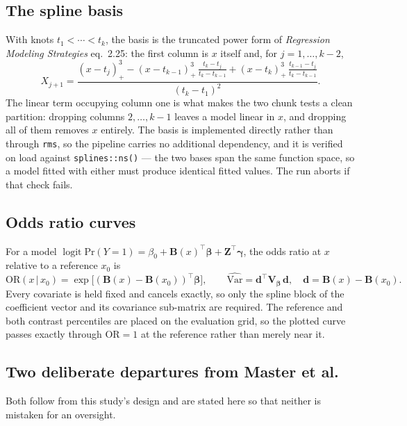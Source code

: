 \documentclass[11pt]{article}
\providecommand{\Pr}{\mathrm{Pr}}
\newcommand{\code}[1]{\texttt{\small #1}}
\begin{document}
\subsection{The spline basis} With knots $t_1 < \cdots < t_k$, the basis is the
truncated power form of \emph{Regression Modeling Strategies} eq.~2.25: the
first column is $x$ itself and, for $j = 1, \ldots, k-2$,
\[
X_{j+1} = \frac{(x-t_j)_+^3
 - (x-t_{k-1})_+^3\,\frac{t_k-t_j}{t_k-t_{k-1}}
 + (x-t_k)_+^3\,\frac{t_{k-1}-t_j}{t_k-t_{k-1}}}{(t_k-t_1)^2}.
\]
The linear term occupying column one is what makes the two chunk tests a clean
partition: dropping columns $2,\ldots,k-1$ leaves a model linear in $x$, and
dropping all of them removes $x$ entirely. The basis is implemented directly
rather than through \code{rms}, so the pipeline carries no additional dependency,
and it is verified on load against \code{splines::ns()} --- the two bases span
the same function space, so a model fitted with either must produce identical
fitted values. The run aborts if that check fails.

\subsection{Odds ratio curves} For a model
$\operatorname{logit}\Pr(Y=1) = \beta_0 + \mathbf{B}(x)^\top\boldsymbol\beta + \mathbf{Z}^\top\boldsymbol\gamma$,
the odds ratio at $x$ relative to a reference $x_0$ is
\[
\mathrm{OR}(x \,\vert\, x_0) = \exp\!\big[(\mathbf{B}(x)-\mathbf{B}(x_0))^\top \boldsymbol\beta\big],
\qquad
\widehat{\mathrm{Var}} = \mathbf{d}^\top \mathbf{V}_{\boldsymbol\beta}\, \mathbf{d},
\quad \mathbf{d} = \mathbf{B}(x)-\mathbf{B}(x_0).
\]
Every covariate is held fixed and cancels exactly, so only the spline block of
the coefficient vector and its covariance sub-matrix are required. The reference
and both contrast percentiles are placed on the evaluation grid, so the plotted
curve passes exactly through $\mathrm{OR}=1$ at the reference rather than merely
near it.

\subsection{Two deliberate departures from Master et al.} Both follow from this
study's design and are stated here so that neither is mistaken for an oversight.
\end{document}
